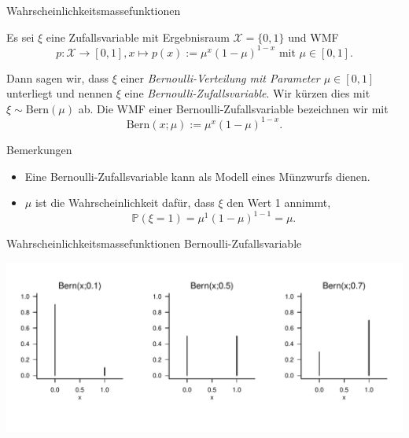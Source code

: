 \documentclass[
  8pt,
  ignorenonframetext,
]{beamer}
\begin{document}
\begin{frame}{Wahrscheinlichkeitsmassefunktionen}
\protect\hypertarget{wahrscheinlichkeitsmassefunktionen-1}{}
\small
\begin{definition}
\justifying
Es sei $\xi$ eine Zufallsvariable mit Ergebnisraum $\mathcal{X} = \{0,1\}$ und WMF
\begin{equation}
p : \mathcal{X} \to [0,1], x\mapsto p(x) := \mu^{x}(1 - \mu)^{1-x} \mbox{ mit } \mu \in [0,1].
\end{equation}

Dann sagen wir, dass $\xi$ einer \textit{Bernoulli-Verteilung mit Parameter
$\mu \in [0,1]$} unterliegt und nennen $\xi$ eine \textit{Bernoulli-Zufallsvariable}.
Wir kürzen dies mit $\xi \sim \mbox{Bern}(\mu)$ ab. Die WMF einer
Bernoulli-Zufallsvariable bezeichnen wir mit
\begin{equation}
\mbox{Bern}(x;\mu) := \mu^x (1 - \mu)^{1 - x}.
\end{equation}
\end{definition}

Bemerkungen

\begin{itemize}
\justifying
\item Eine Bernoulli-Zufallsvariable kann als Modell eines Münzwurfs dienen.
\item $\mu$ ist die Wahrscheinlichkeit dafür, dass $\xi$ den Wert 1 annimmt,
\begin{equation}
\mathbb{P}(\xi = 1) = \mu^1 (1 -\mu)^{1-1} = \mu.
\end{equation}
\end{itemize}
\end{frame}

\begin{frame}{Wahrscheinlichkeitsmassefunktionen}
\protect\hypertarget{wahrscheinlichkeitsmassefunktionen-2}{}
Bernoulli-Zufallsvariable \vspace{1cm}

\begin{center}\includegraphics[width=1\linewidth]{4_Abbildungen/wtfi_4_bernoulliverteilung_wmf} \end{center}
\end{frame}
\end{document}
